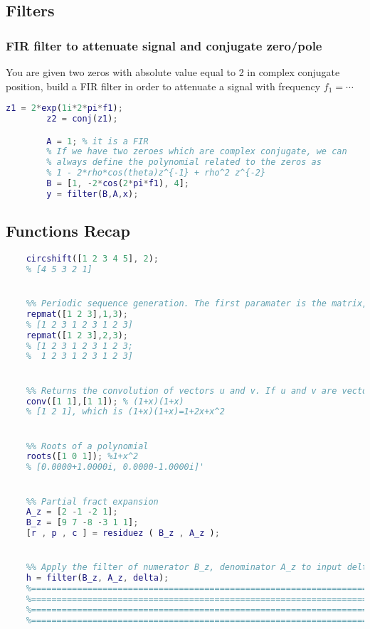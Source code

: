 \pagebreak\subsection{Filters}

    \subsubsection{FIR filter to attenuate signal and conjugate zero/pole}
    You are given two zeros with absolute value equal to 2 in complex conjugate position, build a FIR filter in order to attenuate a signal with frequency $f_1=\cdots$
    \begin{lstlisting}[language=Matlab, escapeinside=`']
        z1 = 2*exp(1i*2*pi*f1);
        z2 = conj(z1);

        A = 1; % it is a FIR
        % If we have two zeroes which are complex conjugate, we can
        % always define the polynomial related to the zeros as
        % 1 - 2*rho*cos(theta)z^{-1} + rho^2 z^{-2}
        B = [1, -2*cos(2*pi*f1), 4];
        y = filter(B,A,x);
    \end{lstlisting}

\pagebreak\subsection{Functions Recap}
\begin{lstlisting}[language=Matlab, escapeinside=`']
    %% Shifting discrete signals, a positive value will shift to the right. Circular, if shifting right by n, first n values will become the last n values
    circshift([1 2 3 4 5], 2);
    % [4 5 3 2 1]


    %% Periodic sequence generation. The first paramater is the matrix, the second one is the rows repetition, the third is the cols repetition
    repmat([1 2 3],1,3);
    % [1 2 3 1 2 3 1 2 3]
    repmat([1 2 3],2,3);
    % [1 2 3 1 2 3 1 2 3;
    %  1 2 3 1 2 3 1 2 3] 


    %% Returns the convolution of vectors u and v. If u and v are vectors of polynomial coefficients, convolving them is equivalent to multiplying the two polynomials.
    conv([1 1],[1 1]); % (1+x)(1+x)
    % [1 2 1], which is (1+x)(1+x)=1+2x+x^2


    %% Roots of a polynomial
    roots([1 0 1]); %1+x^2
    % [0.0000+1.0000i, 0.0000-1.0000i]'


    %% Partial fract expansion
    A_z = [2 -1 -2 1];
    B_z = [9 7 -8 -3 1 1];
    [r , p , c ] = residuez ( B_z , A_z );


    %% Apply the filter of numerator B_z, denominator A_z to input delta
    h = filter(B_z, A_z, delta);
    %==========================================================================
    %==========================================================================
    %==========================================================================
    %==========================================================================
\end{lstlisting}
